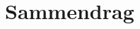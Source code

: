 \documentclass[class=book, crop=false]{standalone}
\begin{document}
\chapter{Sammendrag}
\end{document}
